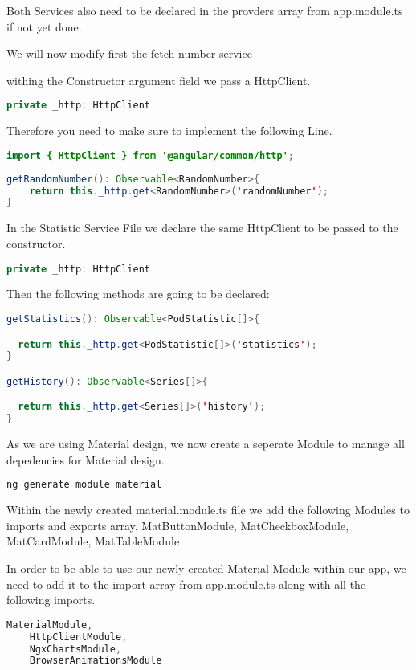 Both Services also need to be declared in the provders array from app.module.ts if not yet done.

We will now modify first the fetch-number service

withing the Constructor argument field we pass a HttpClient.
\begin{lstlisting}[language=Java]
private _http: HttpClient
\end{lstlisting}

Therefore you need to make sure to implement the following Line.
\begin{lstlisting}[language=Java]
import { HttpClient } from '@angular/common/http';
\end{lstlisting}

\begin{lstlisting}[language=Java]
getRandomNumber(): Observable<RandomNumber>{
    return this._http.get<RandomNumber>('randomNumber');
}
\end{lstlisting}

In the Statistic Service File we declare the same HttpClient to be passed to the constructor.
\begin{lstlisting}[language=Java]
private _http: HttpClient
\end{lstlisting}

Then the following methods are going to be declared:
\begin{lstlisting}[language=Java]
getStatistics(): Observable<PodStatistic[]>{

  return this._http.get<PodStatistic[]>('statistics');
}

getHistory(): Observable<Series[]>{

  return this._http.get<Series[]>('history');
}
\end{lstlisting}

As we are using Material design, we now create a seperate Module to manage all depedencies for Material design.

\begin{lstlisting}[language=Bash]
ng generate module material
\end{lstlisting}
Within the newly created material.module.ts file we add the following Modules to imports and exports array.
    MatButtonModule,
    MatCheckboxModule,
    MatCardModule,
    MatTableModule

In order to be able to use our newly created Material Module within our app, we need to add it to the import array from app.module.ts along with all the following imports.
\begin{lstlisting}[language=Java]
	MaterialModule,
    HttpClientModule,
    NgxChartsModule,
    BrowserAnimationsModule
\end{lstlisting}
   
